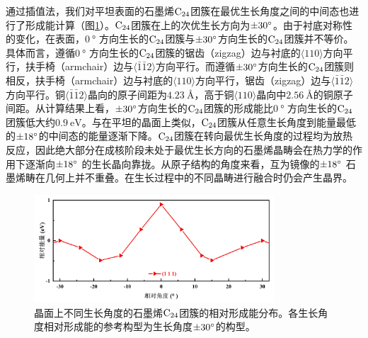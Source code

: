 通过插值法，我们对平坦表面的石墨烯$\rm{C_{24}}$团簇在最优生长角度之间的中间态也进行了形成能计算（图\ref{fig:GO_111_energy}）。$\rm{C_{24}}$团簇在上的次优生长方向为$\SI{\pm 30}{\degree}$。由于衬底对称性的变化，在表面，$\SI{0}{\degree}$ 方向生长的$\rm{C_{24}}$团簇与$\SI{\pm 30}{\degree}$方向生长的$\rm{C_{24}}$团簇并不等价。具体而言，遵循$\SI{0}{\degree}$ 方向生长的$\rm{C_{24}}$团簇的锯齿（zigzag）边与衬底的$\langle 110\rangle$方向平行，扶手椅（armchair）边与$\langle\bar{1}\bar{1}2\rangle$方向平行。而遵循$\SI{\pm 30}{\degree}$方向生长的$\rm{C_{24}}$团簇则相反，扶手椅（armchair）边与衬底的$\langle 110\rangle$方向平行，锯齿（zigzag）边与$\langle\bar{1}\bar{1}2\rangle$方向平行。铜$\langle\bar{1}\bar{1}2\rangle$晶向的原子间距为$\SI{4.23}{\angstrom}$，高于铜$\langle 110\rangle$晶向中$\SI{2.56}{\angstrom}$的铜原子间距。从计算结果上看，$\SI{\pm 30}{\degree}$方向生长的$\rm{C_{24}}$团簇的形成能比$\SI{0}{\degree}$ 方向生长的$\rm{C_{24}}$团簇低大约$\SI{0.9}{\electronvolt}$。与在平坦的晶面上类似，$\rm{C_{24}}$团簇从任意生长角度到能量最低的$\SI{\pm 18 }{\degree}$的中间态的能量逐渐下降。$\rm{C_{24}}$团簇在转向最优生长角度的过程均为放热反应，因此绝大部分在成核阶段未处于最优生长方向的石墨烯晶畴会在热力学的作用下逐渐向$\SI{\pm 18}{\degree}$ 的生长晶向靠拢。从原子结构的角度来看，互为镜像的$\SI{\pm 18}{\degree}$ 石墨烯畴在几何上并不重叠。在生长过程中的不同晶畴进行融合时仍会产生晶界。

\begin{figure}[htb]
    \includegraphics[width=0.8\textwidth]{pic/GO_C24_flat_111_energy.png}
    \caption{晶面上不同生长角度的石墨烯$\rm{C_{24}}$团簇的相对形成能分布。各生长角度相对形成能的参考构型为生长角度$\SI{\pm 30}{\degree}$的构型。
    }
    \label{fig:GO_111_energy}
\end{figure}

